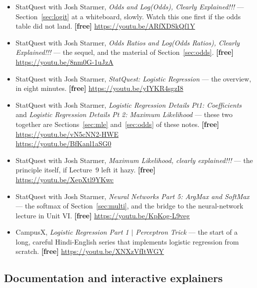 \documentclass[11pt]{article}
\begin{document}
\begin{itemize}[leftmargin=*]
  \item StatQuest with Josh Starmer, \emph{Odds and Log(Odds), Clearly
    Explained!!!} --- Section~\ref{sec:logit} at a whiteboard, slowly. Watch
    this one first if the odds table did not land. \textbf{[free]}
    \url{https://youtu.be/ARfXDSkQf1Y}
  \item StatQuest with Josh Starmer, \emph{Odds Ratios and Log(Odds Ratios),
    Clearly Explained!!!} --- the sequel, and the material of
    Section~\ref{sec:odds}. \textbf{[free]}
    \url{https://youtu.be/8nm0G-1uJzA}
  \item StatQuest with Josh Starmer, \emph{StatQuest: Logistic Regression} ---
    the overview, in eight minutes. \textbf{[free]}
    \url{https://youtu.be/yIYKR4sgzI8}
  \item StatQuest with Josh Starmer, \emph{Logistic Regression Details Pt1:
    Coefficients} and \emph{Logistic Regression Details Pt 2: Maximum
    Likelihood} --- these two together are Sections~\ref{sec:mle}
    and~\ref{sec:odds} of these notes. \textbf{[free]}
    \url{https://youtu.be/vN5cNN2-HWE} \\
    \url{https://youtu.be/BfKanl1aSG0}
  \item StatQuest with Josh Starmer, \emph{Maximum Likelihood, clearly
    explained!!!} --- the principle itself, if Lecture~9 left it hazy.
    \textbf{[free]} \url{https://youtu.be/XepXtl9YKwc}
  \item StatQuest with Josh Starmer, \emph{Neural Networks Part 5: ArgMax and
    SoftMax} --- the softmax of Section~\ref{sec:multi}, and the bridge to
    the neural-network lecture in Unit VI. \textbf{[free]}
    \url{https://youtu.be/KpKog-L9veg}
  \item CampusX, \emph{Logistic Regression Part 1 $\vert$ Perceptron Trick}
    --- the start of a long, careful Hindi-English series that implements
    logistic regression from scratch. \textbf{[free]}
    \url{https://youtu.be/XNXzVfItWGY}
\end{itemize}

\subsection*{Documentation and interactive explainers}
\end{document}
